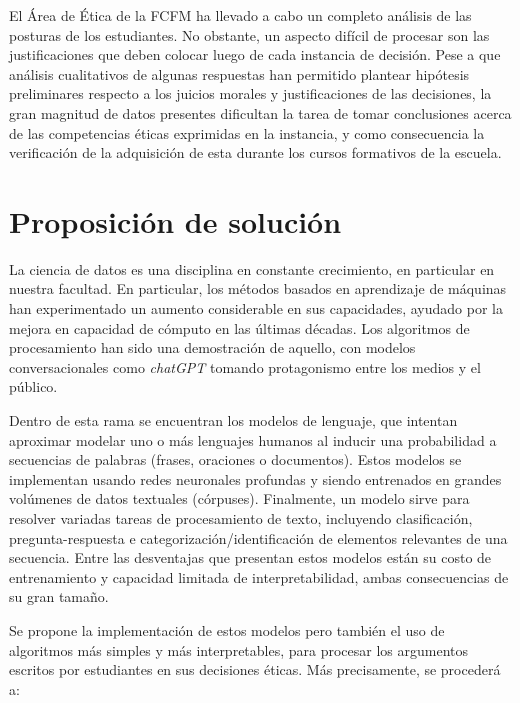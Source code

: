 \documentclass[
	spanish, %
	letterpaper, oneside
]{article}
\begin{document}
\newp El Área de Ética de la FCFM ha llevado a cabo un completo análisis de las posturas de los estudiantes. No obstante, un aspecto difícil de procesar son las justificaciones que deben colocar luego de cada instancia de decisión. Pese a que análisis cualitativos de algunas respuestas han permitido plantear hipótesis preliminares respecto a los juicios morales y justificaciones de las decisiones, la gran magnitud de datos presentes dificultan la tarea de tomar conclusiones acerca de las competencias éticas exprimidas en la instancia, y como consecuencia la verificación de la adquisición de esta durante los cursos formativos de la escuela.


\section{Proposición de solución}

La ciencia de datos es una disciplina en constante crecimiento, en particular en nuestra facultad. En particular, los métodos basados en aprendizaje de máquinas han experimentado un aumento considerable en sus capacidades, ayudado por la mejora en capacidad de cómputo en las últimas décadas. Los algoritmos de procesamiento han sido una demostración de aquello, con modelos conversacionales como \textit{chatGPT} tomando protagonismo entre los medios y el público. 

\newp Dentro de esta rama se encuentran los modelos de lenguaje, que intentan aproximar modelar uno o más lenguajes humanos al inducir una probabilidad a secuencias de palabras (frases, oraciones o documentos). Estos modelos se implementan usando redes neuronales profundas y siendo entrenados en grandes volúmenes de datos textuales (córpuses). Finalmente, un modelo sirve para resolver variadas tareas de procesamiento de texto, incluyendo clasificación, pregunta-respuesta e categorización/identificación de elementos relevantes de una secuencia. Entre las desventajas que presentan estos modelos están su costo de entrenamiento y capacidad limitada de interpretabilidad, ambas consecuencias de su gran tamaño.

\newp Se propone la implementación de estos modelos pero también el uso de algoritmos más simples y más interpretables, para procesar los argumentos escritos por estudiantes en sus decisiones éticas. Más precisamente, se procederá a:
\end{document}
